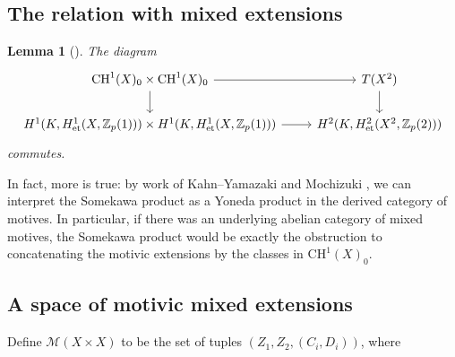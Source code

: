 \documentclass[11pt]{amsart}
\def\Z{\mathbb Z}
\theoremstyle{plain}
\newtheorem{lemma}{Lemma}
\theoremstyle{definition}
\newcommand{\CH}{\mathrm{CH}}
\newcommand{\et}{\mathrm{et}}
\begin{document}
\subsection{The relation with mixed extensions}
\begin{lemma}[\cite{RS}]
The diagram 
\[
\begin{tikzcd}
\CH ^1 (X)_0 \times \CH ^1 (X)_0 \arrow[r] \arrow[d] & T(X^2 ) \arrow[d] \\
H^1 (K,H^1 _{\et }(X,\Z _p (1)))\times H^1 (K,H^1 _{\et }(X,\Z _p (1))) \arrow[r] & H^2 (K,H^2 _{\et }(X^2 ,\Z _p (2)))
\end{tikzcd}
\]
commutes.
\end{lemma}
In fact, more is true: by work of Kahn--Yamazaki \cite{KY} and Mochizuki \cite{mochizuki}, we can interpret the Somekawa product as a Yoneda product in the derived category of motives. In particular, if there was an underlying abelian category of mixed motives, the Somekawa product would be exactly the obstruction to concatenating the motivic extensions by the classes in $\CH ^1 (X)_0$.
%
\subsection{A space of motivic mixed extensions}
Define $\mathcal{M}(X\times X)$ to be the set of tuples $(Z_1 ,Z_2 ,(C_i ,D_i ))$,  where
\end{document}
